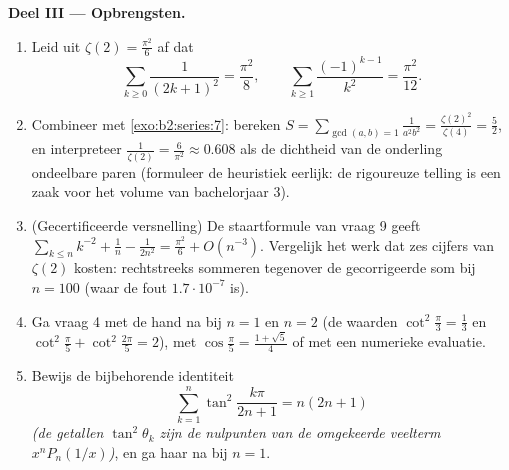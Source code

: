 \begin{problem}[{Weekendopgave --- $\zeta(2) = \pi^2/6$ en het
panorama van Bertrand}]
\medskip
\noindent\textbf{Deel III --- Opbrengsten.}
\begin{enumerate}[resume]
  \item Leid uit $\zeta(2) = \frac{\pi^2}6$ af dat
        \[
        \sum_{k\geq0}\frac{1}{(2k+1)^2} = \frac{\pi^2}{8},
        \qquad
        \sum_{k\geq1}\frac{(-1)^{k-1}}{k^2} = \frac{\pi^2}{12}.
        \]
  \item Combineer met \cref{exo:b2:series:7}: bereken $S =
        \sum_{\gcd(a,b)=1}\frac{1}{a^2b^2} =
        \frac{\zeta(2)^2}{\zeta(4)} = \frac52$, en interpreteer
        $\frac{1}{\zeta(2)} = \frac{6}{\pi^2} \approx 0.608$ als
        de dichtheid van de onderling ondeelbare paren (formuleer
        de heuristiek eerlijk: de rigoureuze telling is een zaak
        voor het volume van bachelorjaar 3).
  \item (Gecertificeerde versnelling) De staartformule van vraag 9
        geeft $\sum_{k\leq n}k^{-2} + \frac1n - \frac1{2n^2} =
        \frac{\pi^2}6 + O(n^{-3})$. Vergelijk het werk dat zes
        cijfers van $\zeta(2)$ kosten: rechtstreeks sommeren
        tegenover de gecorrigeerde som bij $n = 100$ (waar de fout
        $1.7\cdot10^{-7}$ is).
  \item Ga vraag 4 met de hand na bij $n = 1$ en $n = 2$ (de
        waarden $\cot^2\frac\pi3 = \frac13$ en $\cot^2\frac\pi5 +
        \cot^2\frac{2\pi}5 = 2$), met $\cos\frac\pi5 =
        \frac{1+\sqrt5}4$ of met een numerieke evaluatie.
  \item Bewijs de bijbehorende identiteit
        \[
        \sum_{k=1}^{n}\tan^2\frac{k\pi}{2n+1} = n(2n+1)
        \]
        \emph{(de getallen $\tan^2\theta_k$ zijn de nulpunten van
        de omgekeerde veelterm $x^nP_n(1/x)$)}, en ga haar na bij
        $n = 1$.
\end{enumerate}


\end{problem}
